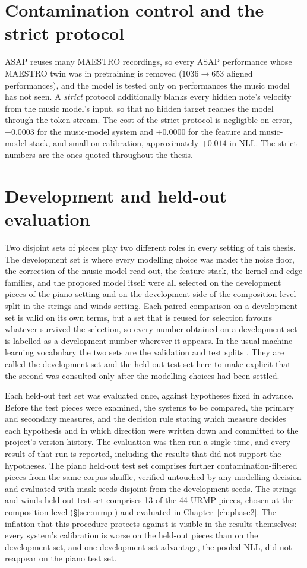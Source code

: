 \section{Contamination control and the strict protocol}\label{sec:contam}
ASAP reuses many MAESTRO recordings, so every ASAP performance whose MAESTRO
twin was in pretraining is removed ($1036 \to 653$ aligned performances), and
the model is tested only on performances the music model has not seen. A
\emph{strict} protocol additionally blanks every hidden note's velocity from
the music model's input, so that no hidden target reaches the model through
the token stream. The cost of the strict protocol is negligible on error,
$+0.0003$ for the music-model system and $+0.0000$ for the feature and
music-model stack, and small on calibration, approximately $+0.014$ in NLL.
The strict numbers are the ones quoted throughout the thesis.

\section{Development and held-out evaluation}\label{sec:hygiene}
Two disjoint sets of pieces play two different roles in every setting of this
thesis. The development set is where every modelling choice was made: the
noise floor, the correction of the music-model read-out, the feature stack,
the kernel and edge families, and the proposed model itself were all selected
on the \nPieces{} development pieces of the piano setting and on the
development side of the composition-level split in the strings-and-winds
setting. Each paired comparison on a development set is valid on its own
terms, but a set that is reused for selection favours whatever survived the
selection, so every number obtained on a development set is labelled as a
development number wherever it appears. In the usual machine-learning
vocabulary the two sets are the validation and test splits \cite{nosek2018}.
They are called the development set and the held-out test set here to make
explicit that the second was consulted only after the modelling choices had
been settled.

Each held-out test set was evaluated once, against hypotheses fixed in
advance. Before the test pieces were examined, the systems to be compared,
the primary and secondary measures, and the decision rule stating which
measure decides each hypothesis and in which direction were written down and
committed to the project's version history. The evaluation was then run a
single time, and every result of that run is reported, including the results
that did not support the hypotheses. The piano held-out test set comprises
\nConfPieces{} further contamination-filtered pieces from the same corpus
shuffle, verified untouched by any modelling decision and evaluated with mask
seeds disjoint from the development seeds. The strings-and-winds held-out
test set comprises 13 of the 44 URMP pieces, chosen at the composition level
(\S\ref{sec:urmp}) and evaluated in Chapter~\ref{ch:phase2}. The inflation
that this procedure protects against is visible in the results themselves:
every system's calibration is worse on the held-out pieces than on the
development set, and one development-set advantage, the pooled NLL, did not
reappear on the piano test set.


